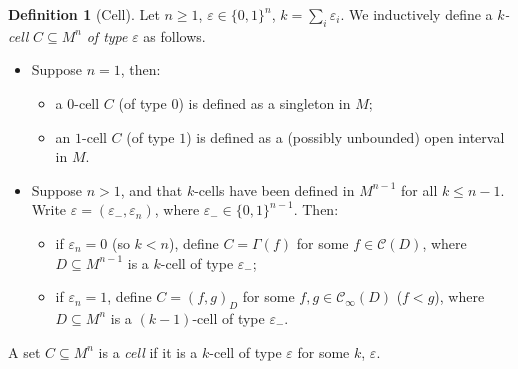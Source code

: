 \documentclass[a4paper]{report}
\newcommand{\C}{\mathcal{C}}
\theoremstyle{definition}
\newtheorem{defn}[thm]{Definition}
\theoremstyle{remstyle}
\begin{document}
\begin{defn}[Cell]\label{cell}
	Let $n\geq 1$, $\varepsilon\in\{0,1\}^n$, $k=\sum_i \varepsilon_i$. We inductively define a \emph{$k$-cell} $C\subseteq M^n$ \emph{of type} $\varepsilon$ as follows.
	\begin{itemize}
		\item Suppose $n=1$, then:
		      \begin{itemize}
			      \item a $0$-cell $C$ (of type $0$) is defined as a singleton in $M$;
			      \item an $1$-cell $C$ (of type $1$) is defined as a (possibly unbounded) open interval in $M$.
		      \end{itemize}
		\item Suppose $n>1$, and that $k$-cells have been defined in $M^{n-1}$ for all $k\leq n-1$. Write $\varepsilon=(\varepsilon_-,\varepsilon_n)$, where $\varepsilon_-\in\{0,1\}^{n-1}$. Then:
		      \begin{itemize}
			      \item if $\varepsilon_n=0$ (so $k<n$), define $C=\Gamma(f)$ for some $f\in \C(D)$, where $D\subseteq M^{n-1}$ is a $k$-cell of type $\varepsilon_-$;
			      \item if $\varepsilon_n=1$, define $C=(f,g)_D$ for some $f,g\in \C_{\infty}(D)$ ($f<g$), where $D\subseteq M^n$ is a $(k-1)$-cell of type $\varepsilon_-$.
		      \end{itemize}
	\end{itemize}
	A set $C\subseteq M^n$ is a \emph{cell} if it is a $k$-cell of type $\varepsilon$ for some $k$, $\varepsilon$.
\end{defn}
\end{document}
